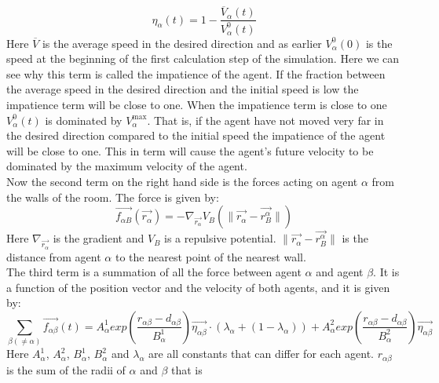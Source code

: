 \documentclass[12pt,a4paper]{report} %
\begin{document}
\begin{equation}
	\eta_{\alpha} \left( t \right) = 1 - \frac{\overline{V}_{\alpha} \left( t \right)}{V_{\alpha}^{0} \left( t \right)}
\end{equation}
Here $\overline{V}$ is the average speed in the desired direction and as earlier $V_{\alpha}^{0} \left( 0 \right)$ is the speed at the beginning of the first calculation step of the simulation. Here we can see why this term is called the impatience of the agent. If the fraction between the average speed in the desired direction and the initial speed is low the impatience term will be close to one. When the impatience term is close to one $V_{\alpha}^{0} \left( t \right)$ is dominated by $V_{\alpha}^{\text{max}}$. That is, if the agent have not moved very far in the desired direction compared to the initial speed the impatience of the agent will be close to one. This in term will cause the agent's future velocity to be dominated by the maximum velocity of the agent.\\
Now the second term on the right hand side is the forces acting on agent $\alpha$ from the walls of the room. The force is given by:
\begin{equation}
\vec{f_{\alpha B}} \left( \vec{r_{\alpha}} \right) = - \nabla_{\vec{r_{\alpha}}} V_{B} \left( \| \vec{r_{\alpha}} - \vec{r_{B}^{\alpha}} \| \right) 
\end{equation}
Here $\nabla_{\vec{r_{\alpha}}}$ is the gradient and $V_B$ is a repulsive potential. $ \| \vec{r_{\alpha}} - \vec{r_{B}^{\alpha}} \|$ is the distance from agent $\alpha$ to the nearest point of the nearest wall.\\
The third term is a summation of all the force between agent $\alpha$ and agent $\beta$. It is a function of the position vector and the velocity of both agents, and it is given by:
\begin{equation}\label{agentinteraction}
\sum_{\beta \left( \neq \alpha \right)} \vec{f_{\alpha \beta }}\left( t \right) = 
A_{\alpha}^{1} exp \left( \frac{ r_{\alpha \beta} - d_{\alpha \beta }}{B_{\alpha}^1} \right)
\vec{\eta_{\alpha \beta}} \cdot 
\left( \lambda_{\alpha} + \left( 1 - \lambda_{\alpha} \right)  \right)+ 
A_{\alpha}^{2} exp\left(\frac{r_{\alpha \beta} - d_{\alpha \beta}}{B_{\alpha}^{2}} \right)\vec{\eta_{\alpha \beta}}
\end{equation}
Here $A_{\alpha}^{1}$, $A_{\alpha}^{2}$, $B_{\alpha}^{1}$, $B_{\alpha}^{2}$ and $\lambda_{\alpha}$ are all constants that can differ for each agent. $r_{\alpha \beta}$ is the sum of the radii of $\alpha$ and $\beta$ that is 
\end{document}
